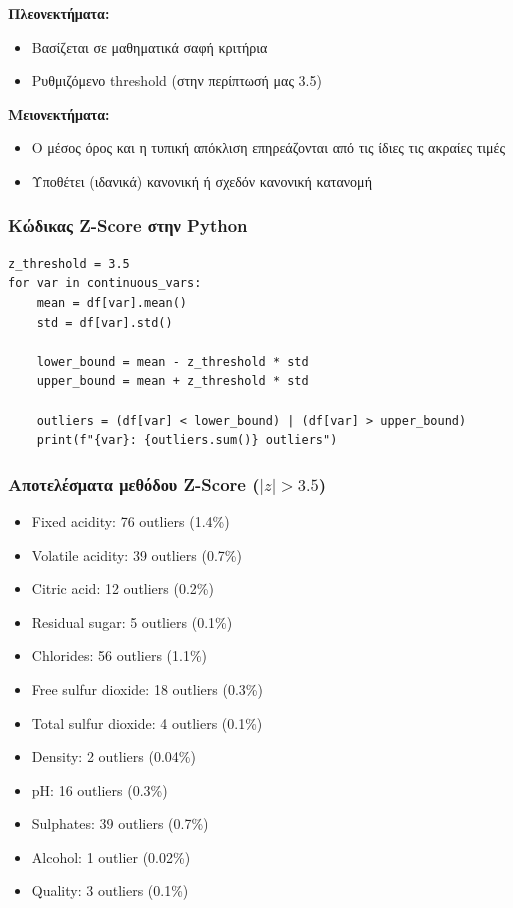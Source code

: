 \documentclass[12pt,a4paper]{article}
\begin{document}
\textbf{Πλεονεκτήματα:}
\begin{itemize}
    \item Βασίζεται σε μαθηματικά σαφή κριτήρια
    \item Ρυθμιζόμενο threshold (στην περίπτωσή μας 3.5)
\end{itemize}

\textbf{Μειονεκτήματα:}
\begin{itemize}
    \item Ο μέσος όρος και η τυπική απόκλιση επηρεάζονται από τις ίδιες τις ακραίες τιμές
    \item Υποθέτει (ιδανικά) κανονική ή σχεδόν κανονική κατανομή
\end{itemize}

\subsubsection{Κώδικας Z-Score στην Python}

\begin{lstlisting}
z_threshold = 3.5
for var in continuous_vars:
    mean = df[var].mean()
    std = df[var].std()

    lower_bound = mean - z_threshold * std
    upper_bound = mean + z_threshold * std

    outliers = (df[var] < lower_bound) | (df[var] > upper_bound)
    print(f"{var}: {outliers.sum()} outliers")
\end{lstlisting}

\subsubsection{Αποτελέσματα μεθόδου Z-Score ($|z| > 3.5$)}

\begin{itemize}
    \item Fixed acidity: 76 outliers (1.4\%)
    \item Volatile acidity: 39 outliers (0.7\%)
    \item Citric acid: 12 outliers (0.2\%)
    \item Residual sugar: 5 outliers (0.1\%)
    \item Chlorides: 56 outliers (1.1\%)
    \item Free sulfur dioxide: 18 outliers (0.3\%)
    \item Total sulfur dioxide: 4 outliers (0.1\%)
    \item Density: 2 outliers (0.04\%)
    \item pH: 16 outliers (0.3\%)
    \item Sulphates: 39 outliers (0.7\%)
    \item Alcohol: 1 outlier (0.02\%)
    \item Quality: 3 outliers (0.1\%)
\end{itemize}
\end{document}
